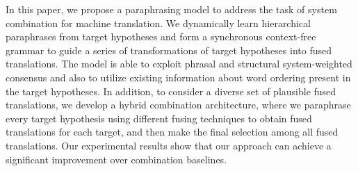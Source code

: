 In this paper, we propose a paraphrasing model to address the task of system combination for machine translation. We dynamically learn hierarchical paraphrases from target hypotheses and form a synchronous context-free grammar to guide a series of transformations of target hypotheses into fused translations. The model is able to exploit phrasal and structural system-weighted consensus and also to utilize existing information about word ordering present in the target hypotheses. In addition, to consider a diverse set of plausible fused translations, we develop a hybrid combination architecture, where we paraphrase every target hypothesis using different fusing techniques to obtain fused translations for each target, and then make the final selection among all fused translations. Our experimental results show that our approach can achieve a significant improvement over combination baselines.
